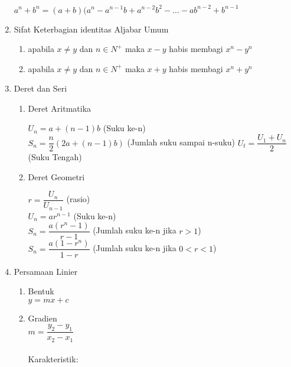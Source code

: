 \begin{enumerate}
\begin{center}
				$a^n+b^n=(a+b)(a^n-a^{n-1}b+a^{n-2}b^{2}-...-ab^{n-2}+b^{n-1}$
			\end{center}
			\item Sifat Keterbagian identitas Aljabar Umum
			\begin{enumerate}
				\item apabila $x\neq y$ dan $n\in N^+$ maka $x-y$ habis membagi $x^n-y^n$
				\item apabila $x\neq y$ dan $n\in N^+$ maka $x+y$ habis membagi $x^n+y^n$
			\end{enumerate}
			\item Deret dan Seri
			\begin{enumerate}
				\item Deret Aritmatika
					\begin{center}
						$U_n=a+(n-1)b$ (Suku ke-n)\\
						$S_n=\dfrac{n}{2}(2a+(n-1)b)$ (Jumlah suku sampai n-suku)
						$U_t=\dfrac{U_1+U_n}{2}$ (Suku Tengah)
					\end{center}
				\item Deret Geometri
					\begin{center}
						$r=\dfrac{U_{n}}{U_{n-1}}$ (rasio)\\
						$U_n=ar^{n-1}$ (Suku ke-n)\\
						$S_n=\dfrac{a(r^n-1)}{r-1}$ (Jumlah suku ke-n jika $r>1$)\\
						$S_n=\dfrac{a(1-r^n)}{1-r}$ (Jumlah suku ke-n jika $0<r<1$)
					\end{center}
			\end{enumerate}
			\item Persamaan Linier
				\begin{enumerate}
					\item Bentuk\\
					$y=mx+c$
					\item Gradien\\
					$m=\dfrac{y_2-y_1}{x_2-x_1}$\\
					\\
					Karakteristik:
			

\end{enumerate}
\end{enumerate}
